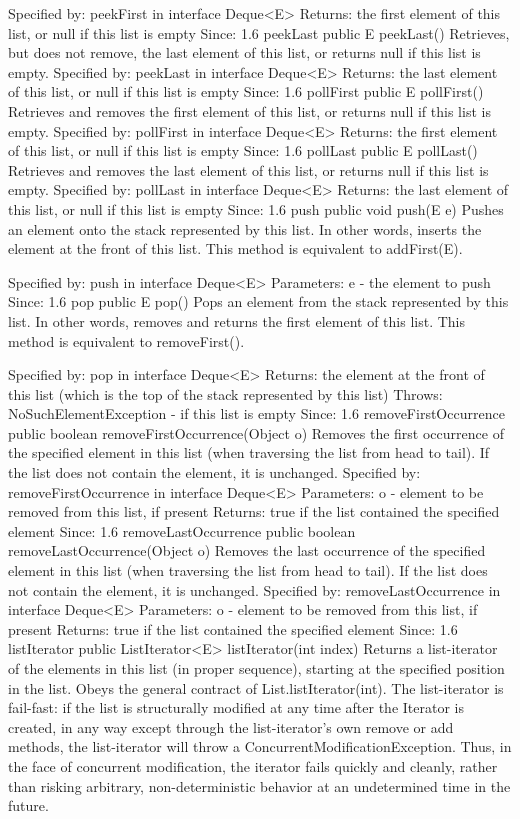 \documentclass[babel]{book}
\begin{document}
Specified by:
peekFirst in interface Deque<E>
Returns:
the first element of this list, or null if this list is empty
Since:
1.6
peekLast
public E peekLast()
Retrieves, but does not remove, the last element of this list, or returns null if this list is empty.
Specified by:
peekLast in interface Deque<E>
Returns:
the last element of this list, or null if this list is empty
Since:
1.6
pollFirst
public E pollFirst()
Retrieves and removes the first element of this list, or returns null if this list is empty.
Specified by:
pollFirst in interface Deque<E>
Returns:
the first element of this list, or null if this list is empty
Since:
1.6
pollLast
public E pollLast()
Retrieves and removes the last element of this list, or returns null if this list is empty.
Specified by:
pollLast in interface Deque<E>
Returns:
the last element of this list, or null if this list is empty
Since:
1.6
push
public void push(E e)
Pushes an element onto the stack represented by this list. In other words, inserts the element at the front of this list.
This method is equivalent to addFirst(E).

Specified by:
push in interface Deque<E>
Parameters:
e - the element to push
Since:
1.6
pop
public E pop()
Pops an element from the stack represented by this list. In other words, removes and returns the first element of this list.
This method is equivalent to removeFirst().

Specified by:
pop in interface Deque<E>
Returns:
the element at the front of this list (which is the top of the stack represented by this list)
Throws:
NoSuchElementException - if this list is empty
Since:
1.6
removeFirstOccurrence
public boolean removeFirstOccurrence(Object o)
Removes the first occurrence of the specified element in this list (when traversing the list from head to tail). If the list does not contain the element, it is unchanged.
Specified by:
removeFirstOccurrence in interface Deque<E>
Parameters:
o - element to be removed from this list, if present
Returns:
true if the list contained the specified element
Since:
1.6
removeLastOccurrence
public boolean removeLastOccurrence(Object o)
Removes the last occurrence of the specified element in this list (when traversing the list from head to tail). If the list does not contain the element, it is unchanged.
Specified by:
removeLastOccurrence in interface Deque<E>
Parameters:
o - element to be removed from this list, if present
Returns:
true if the list contained the specified element
Since:
1.6
listIterator
public ListIterator<E> listIterator(int index)
Returns a list-iterator of the elements in this list (in proper sequence), starting at the specified position in the list. Obeys the general contract of List.listIterator(int).
The list-iterator is fail-fast: if the list is structurally modified at any time after the Iterator is created, in any way except through the list-iterator's own remove or add methods, the list-iterator will throw a ConcurrentModificationException. Thus, in the face of concurrent modification, the iterator fails quickly and cleanly, rather than risking arbitrary, non-deterministic behavior at an undetermined time in the future.
\end{document}
